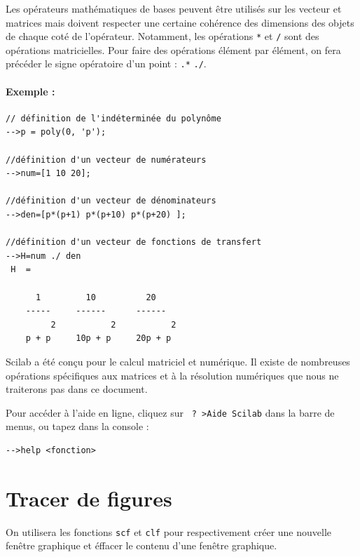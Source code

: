 Les opérateurs mathématiques de bases peuvent être utilisés 
sur les vecteur et matrices mais doivent respecter une certaine 
cohérence des dimensions des objets de chaque coté de l'opérateur. 
Notamment, les opérations \verb?*? et \verb?/? sont des opérations 
matricielles. Pour faire des opérations élément par élément,
on fera précéder le signe opératoire d'un point : \verb?.*? \verb?./?.

\paragraph{Exemple :}
\begin{code}
\begin{verbatim}
// définition de l'indéterminée du polynôme
-->p = poly(0, 'p');

//définition d'un vecteur de numérateurs
-->num=[1 10 20];

//définition d'un vecteur de dénominateurs
-->den=[p*(p+1) p*(p+10) p*(p+20) ];

//définition d'un vecteur de fonctions de transfert
-->H=num ./ den
 H  =
 
      1         10          20      
    -----     ------      ------    
         2           2           2  
    p + p     10p + p     20p + p   
\end{verbatim}
\end{code}

Scilab a été conçu pour le calcul matriciel et numérique. 
Il existe de nombreuses opérations spécifiques aux matrices et à la 
résolution numériques que nous ne traiterons pas dans ce document.

Pour accéder à l'aide en ligne, cliquez sur \verb/ ? >Aide Scilab/ 
dans la barre de menus, ou tapez   dans la console :
\begin{code}
\begin{verbatim}
-->help <fonction>
\end{verbatim}
\end{code}

\section{Tracer de figures}
On utilisera les fonctions \verb?scf? et \verb?clf?  pour respectivement
créer une nouvelle fenêtre graphique et éffacer le contenu d'une fenêtre 
graphique.

